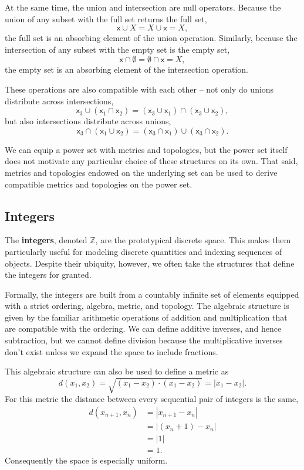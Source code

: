 \documentclass[
  letterpaper,
  DIV=11,
  numbers=noendperiod]{scrartcl}
\begin{document}
At the same time, the union and intersection are null operators. Because
the union of any subset with the full set returns the full set, \[
\mathsf{x} \cup X = X \cup \mathsf{x} = X,
\] the full set is an absorbing element of the union operation.
Similarly, because the intersection of any subset with the empty set is
the empty set, \[
\mathsf{x} \cap \emptyset = \emptyset \cap \mathsf{x} = X,
\] the empty set is an absorbing element of the intersection operation.

These operations are also compatible with each other -- not only do
unions distribute across intersections, \[
\mathsf{x}_{3} \cup ( \mathsf{x}_{1} \cap \mathsf{x}_{2} )
=
(\mathsf{x}_{3} \cup \mathsf{x}_{1}) \cap
(\mathsf{x}_{3} \cup \mathsf{x}_{2}),
\] but also intersections distribute across unions, \[
\mathsf{x}_{3} \cap ( \mathsf{x}_{1} \cup \mathsf{x}_{2} )
=
(\mathsf{x}_{3} \cap \mathsf{x}_{1}) \cup
(\mathsf{x}_{3} \cap \mathsf{x}_{2}).
\]

We can equip a power set with metrics and topologies, but the power set
itself does not motivate any particular choice of these structures on
its own. That said, metrics and topologies endowed on the underlying set
can be used to derive compatible metrics and topologies on the power
set.

\subsection{Integers}\label{integers}

The \textbf{integers}, denoted \(\mathbb{Z}\), are the prototypical
discrete space. This makes them particularly useful for modeling
discrete quantities and indexing sequences of objects. Despite their
ubiquity, however, we often take the structures that define the integers
for granted.

Formally, the integers are built from a countably infinite set of
elements equipped with a strict ordering, algebra, metric, and topology.
The algebraic structure is given by the familiar arithmetic operations
of addition and multiplication that are compatible with the ordering. We
can define additive inverses, and hence subtraction, but we cannot
define division because the multiplicative inverses don't exist unless
we expand the space to include fractions.

This algebraic structure can also be used to define a metric as \[
d(x_{1}, x_{2})
= \sqrt{ (x_{1} - x_{2}) \cdot (x_{1} - x_{2}) }
= | x_{1} - x_{2} |.
\] For this metric the distance between every sequential pair of
integers is the same, \begin{align*}
d(x_{n + 1}, x_{n})
&= | x_{n + 1} - x_{n} |
\\
&= | (x_{n} + 1) - x_{n} |
\\
&= | 1 |
\\
&= 1.
\end{align*} Consequently the space is especially uniform.
\end{document}

